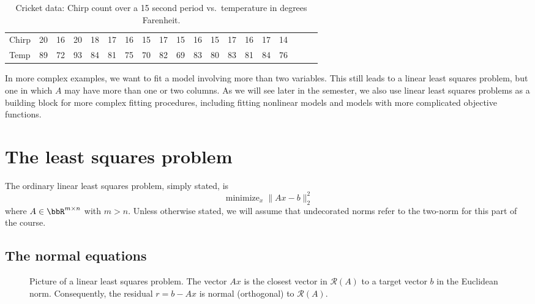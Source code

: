\documentclass[12pt, leqno]{article} %
\begin{document}
\begin{table}
  \small
  \begin{tabular}{l|cccccccccccccccccc}
    Chirp &
    20& 16& 20& 18& 17& 16& 15& 17& 15& 16& 15& 17& 16& 17& 14 \\
    Temp &
    89& 72& 93& 84& 81& 75& 70& 82& 69& 83& 80& 83& 81& 84& 76
  \end{tabular}
  \caption{Cricket data: Chirp count over a 15 second period vs.~temperature
    in degrees Farenheit.}
  \label{table1}
\end{table}

In more complex examples, we want to fit a model involving more than
two variables.  This still leads to a linear least squares problem,
but one in which $A$ may have more than one or two columns.  As we
will see later in the semester, we also use linear least squares
problems as a building block for more complex fitting procedures,
including fitting nonlinear models and models with more complicated
objective functions.

\section{The least squares problem}

The ordinary linear least squares problem, simply stated, is
\[
  \operatorname{minimize}_x \|Ax-b\|_2^2
\]
where $A \in \bbR^{m \times n}$ with $m > n$.
Unless otherwise stated, we will assume that undecorated norms
refer to the two-norm for this part of the course.

\subsection{The normal equations}

\begin{figure}
  \begin{center}
  \end{center}
  \caption{Picture of a linear least squares problem.  The vector $Ax$
           is the closest vector in $\mathcal{R}(A)$ to a target
           vector $b$ in the Euclidean norm.  Consequently, the
           residual $r = b-Ax$ is normal (orthogonal) to
           $\mathcal{R}(A)$.}
  \label{fig1}
\end{figure}
\end{document}
